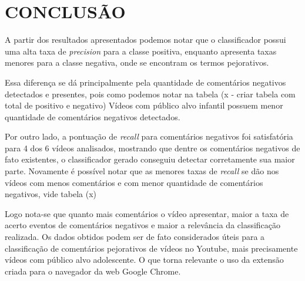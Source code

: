 \section{CONCLUSÃO}

A partir dos resultados apresentados podemos notar que o classificador possui uma alta taxa de \textit{precision} para a classe positiva, enquanto apresenta taxas menores para a classe negativa, onde se encontram os termos pejorativos.

Essa diferença se dá principalmente pela quantidade de comentários negativos detectados e presentes, pois como podemos notar na tabela (x - criar tabela com total de positivo e negativo) %
Vídeos com público alvo infantil possuem menor quantidade de comentários negativos detectados.

Por outro lado, a pontuação de \textit{recall} para comentários negativos foi satisfatória para 4 dos 6 vídeos analisados, mostrando que dentre os comentários negativos de fato existentes, o classificador gerado conseguiu detectar corretamente sua maior parte. Novamente é possível notar que as menores taxas de \textit{recall} se dão nos vídeos com menos comentários e com menor quantidade de comentários negativos, vide tabela (x)%


Logo nota-se que quanto mais comentários o vídeo apresentar, maior a taxa de acerto eventos de comentários negativos e maior a relevância da classificação realizada.
Os dados obtidos podem ser de fato considerados úteis para a classificação de comentários pejorativos de vídeos no Youtube, mais precisamente vídeos com público alvo adolescente. O que torna relevante o uso da extensão criada para o navegador da web Google Chrome.
